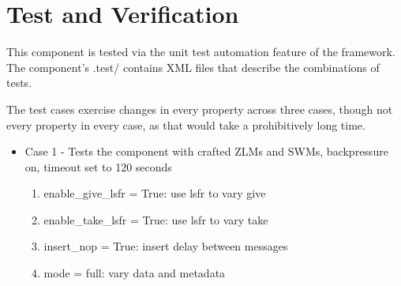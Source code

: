 \documentclass{article}
\begin{document}
\section*{Test and Verification}
\begin{flushleft}
This component is tested via the unit test automation feature of the framework. The component's .test/ contains XML files that describe the combinations of tests. \medskip

The test cases exercise changes in every property across three cases, though not every property in every case, as that would take a prohibitively long time.

\begin{itemize}


\item Case 1 - Tests the component with crafted ZLMs and SWMs, backpressure on, timeout set to 120 seconds
\begin{enumerate}
	\item enable\_give\_lsfr = True: use lsfr to vary give
	\item enable\_take\_lsfr = True: use lsfr to vary take
	\item insert\_nop = True: insert delay between messages
	\item mode = full: vary data and metadata
\end{enumerate}


\end{itemize}
\end{flushleft}
\end{document}
